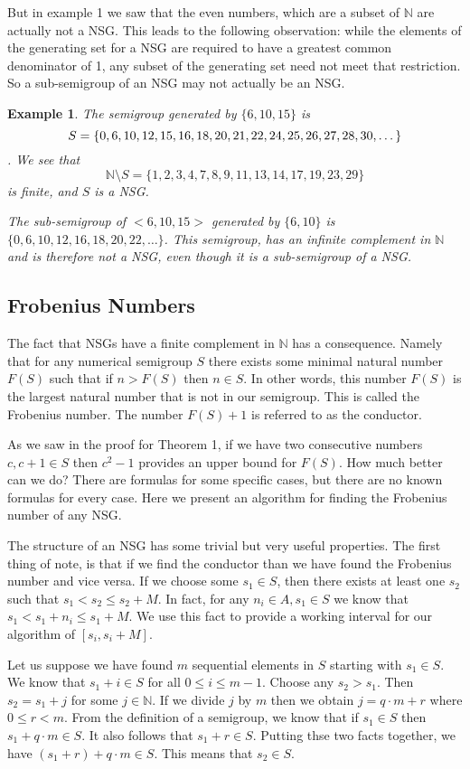 \documentclass[11pt]{amsart}
\theoremstyle{plain}
\newtheorem{exa}{Example}
\theoremstyle{definition}
\begin{document}
But in example 1 we saw that the even numbers, which are a subset of $\mathbb{N}$ are actually not a NSG. This leads to the following observation: while the elements of the generating set for a NSG are required to have a greatest common denominator of 1, any subset of the generating set need not meet that restriction. So a sub-semigroup of an NSG may not actually be an NSG.
\begin{exa}
  The semigroup generated by $\{6,10,15\}$ is $$S=\{0, 6, 10, 12, 15, 16, 18,
  20, 21, 22,\\ 24, 25, 26, 27, 28, 30, \dots \}$$. We see that $$\mathbb{N}\setminus
  S=\{1,2,3,4,7,8,9,11,13,
  14,17,19,23,29\}$$ is finite, and $S$ is a NSG.

  The sub-semigroup of $<6,10,15>$ generated by $\{6,10\}$ is $\{0,6,10,12,16,18,20,22,\dots\}$. This semigroup, has an infinite complement in $\mathbb{N}$ and is therefore not a NSG, even though it is a sub-semigroup of a NSG.
\end{exa}
\subsection{Frobenius Numbers}
The fact that NSGs have a finite complement in $\mathbb{N}$ has
a consequence. Namely that for any numerical semigroup $S$ there exists some minimal
natural number $F(S)$ such that if $n>F(S)$ then $n\in S$. In other words, this number
$F(S)$ is the largest natural number that is not in our semigroup. This is
called the Frobenius number. The number $F(S)+1$ is referred to as
the conductor\cite{rosales}.

As we saw in the proof for Theorem 1, if we have two consecutive numbers $c,c+1\in S$ then $c^2-1$ provides an upper bound for $F(S)$.
How much better can we do?
There are formulas for some specific cases, but there are no known formulas for every case.
Here we present an algorithm for finding the Frobenius number of any NSG.

The structure of an NSG has some trivial but very useful properties.
The first thing of note, is that if we find the conductor than  we have found the Frobenius number and vice versa.
If we choose some $s_1\in S$, then there exists at least one $s_2$ such that
$s_1<s_2\le s_2+M$.
In fact, for any $n_i\in A,s_1\in S$ we know that $s_1<s_1+n_i\le s_1+M$.
We use this fact to provide a working interval for our algorithm of $[s_i,s_i+M]$.

Let us suppose we have found $m$ sequential elements in $S$ starting with $s_1\in S$.
We know that $s_1+i\in S$ for all $0\le i\le m-1$.
Choose any $s_2>s_1$. Then $s_2=s_1+j$ for some $j\in \mathbb{N}$.
If we divide $j$ by $m$ then we obtain $j=q\cdot m+r$ where $0\le r< m$.
From the definition of a semigroup, we know that if $s_1\in S$ then $s_1+q\cdot m\in S$.
It also follows that $s_1+r\in S$.
Putting thse two facts together, we have $(s_1+r)+q\cdot m\in S$.
This means that $s_2\in S$.
\end{document}
